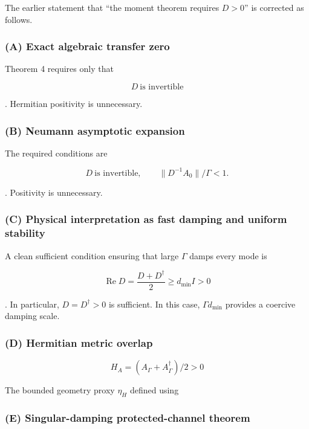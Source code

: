 \documentclass[
  10pt,
  a4paper,
]{article}
\begin{document}
The earlier statement that ``the moment theorem requires \(D>0\)'' is
corrected as follows.

\subsubsection{(A) Exact algebraic transfer
zero}\label{a-exact-algebraic-transfer-zero}

Theorem 4 requires only that

\[
\boxed{D\ \text{is invertible}}
\]

. Hermitian positivity is unnecessary.

\subsubsection{(B) Neumann asymptotic
expansion}\label{b-neumann-asymptotic-expansion}

The required conditions are

\[
D\ \text{is invertible},
\qquad
\|D^{-1}A_0\|/\Gamma<1.
\]

. Positivity is unnecessary.

\subsubsection{(C) Physical interpretation as fast damping and uniform
stability}\label{c-physical-interpretation-as-fast-damping-and-uniform-stability}

A clean sufficient condition ensuring that large \(\Gamma\) damps every
mode is

\[
\boxed{
\operatorname{Re}D
=\frac{D+D^\dagger}{2}
\ge d_{\min}I>0
}
\]

. In particular, \(D=D^\dagger>0\) is sufficient. In this case,
\(\Gamma d_{\min}\) provides a coercive damping scale.

\subsubsection{(D) Hermitian metric
overlap}\label{d-hermitian-metric-overlap}

\[
H_A=(A_\Gamma+A_\Gamma^\dagger)/2>0
\]

The bounded geometry proxy \(\eta_H\) defined using

\subsubsection{(E) Singular-damping protected-channel
theorem}\label{e-singular-damping-protected-channel-theorem}
\end{document}
